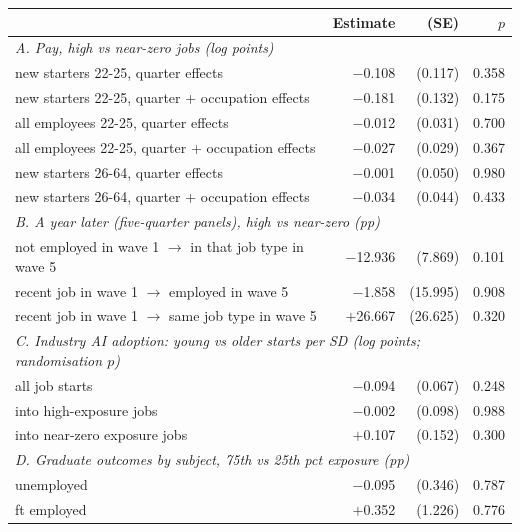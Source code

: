 \begin{tabular}{lrrr}
\toprule
 & Estimate & (SE) & $p$ \\
\midrule
\multicolumn{4}{l}{\emph{A. Pay, high vs near-zero jobs (log points)}}\\
\quad new starters 22-25, quarter effects & \ensuremath{-}0.108 & (0.117) & 0.358 \\
\quad new starters 22-25, quarter + occupation effects & \ensuremath{-}0.181 & (0.132) & 0.175 \\
\quad all employees 22-25, quarter effects & \ensuremath{-}0.012 & (0.031) & 0.700 \\
\quad all employees 22-25, quarter + occupation effects & \ensuremath{-}0.027 & (0.029) & 0.367 \\
\quad new starters 26-64, quarter effects & \ensuremath{-}0.001 & (0.050) & 0.980 \\
\quad new starters 26-64, quarter + occupation effects & \ensuremath{-}0.034 & (0.044) & 0.433 \\
\multicolumn{4}{l}{\emph{B. A year later (five-quarter panels), high vs near-zero (pp)}}\\
\quad not employed in wave 1 $\to$ in that job type in wave 5 & \ensuremath{-}12.936 & (7.869) & 0.101 \\
\quad recent job in wave 1 $\to$ employed in wave 5 & \ensuremath{-}1.858 & (15.995) & 0.908 \\
\quad recent job in wave 1 $\to$ same job type in wave 5 & \ensuremath{+}26.667 & (26.625) & 0.320 \\
\multicolumn{4}{l}{\emph{C. Industry AI adoption: young vs older starts per SD (log points; randomisation $p$)}}\\
\quad all job starts & \ensuremath{-}0.094 & (0.067) & 0.248 \\
\quad into high-exposure jobs & \ensuremath{-}0.002 & (0.098) & 0.988 \\
\quad into near-zero exposure jobs & \ensuremath{+}0.107 & (0.152) & 0.300 \\
\multicolumn{4}{l}{\emph{D. Graduate outcomes by subject, 75th vs 25th pct exposure (pp)}}\\
\quad unemployed & \ensuremath{-}0.095 & (0.346) & 0.787 \\
\quad ft employed & \ensuremath{+}0.352 & (1.226) & 0.776 \\
\bottomrule
\end{tabular}
